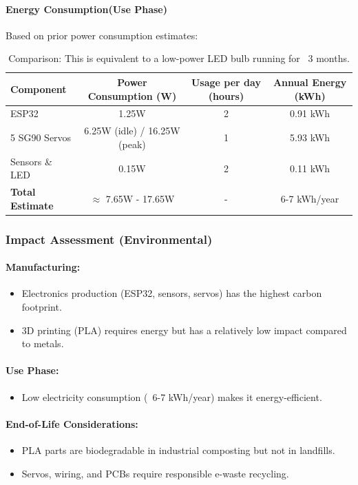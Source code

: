 \documentclass{article}
\begin{document}
\paragraph{Energy Consumption(Use Phase)}
Based on prior power consumption estimates:
\begin{table}[h]
    \hspace*{-2.2cm}
    \centering
    \begin{tabular}{|l|c|c|c|}
        \hline
        \textbf{Component} & \textbf{Power Consumption (W)} & \textbf{Usage per day (hours)} & \textbf{Annual Energy (kWh)} \\ 
        \hline
        ESP32 & 1.25W & 2 & 0.91 kWh \\ 
        \hline
        5 SG90 Servos & 6.25W (idle) / 16.25W (peak) & 1 & 5.93 kWh \\ 
        \hline
        Sensors \& LED & 0.15W & 2 & 0.11 kWh \\ 
        \hline
        \textbf{Total Estimate} & $\approx$ 7.65W - 17.65W & - & 6-7 kWh/year \\ 
        \hline
    \end{tabular}
    \caption{Comparison: This is equivalent to a low-power LED bulb running for ~3 months.}
    \label{tab:energy_consumption}
\end{table}
\subsubsection{Impact Assessment (Environmental)}
\paragraph{Manufacturing:}
\begin{itemize}
\item Electronics production (ESP32, sensors, servos) has the highest carbon footprint.
\item 3D printing (PLA) requires energy but has a relatively low impact compared to metals.
\end{itemize}
\paragraph{Use Phase:}
\begin{itemize}
\item Low electricity consumption (~6-7 kWh/year) makes it energy-efficient.
\end{itemize}
\paragraph{End-of-Life Considerations:}
\begin{itemize}
\item PLA parts are biodegradable in industrial composting but not in landfills.
\item Servos, wiring, and PCBs require responsible e-waste recycling.
\end{itemize}
\end{document}
